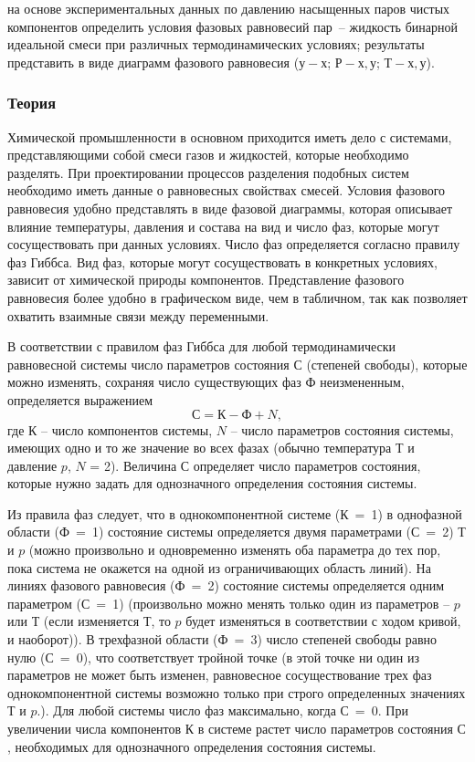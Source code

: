 
\goal на основе экспериментальных данных по давлению насыщенных паров чистых компонентов определить условия фазовых равновесий пар~-- жидкость бинарной идеальной смеси при различных термодинамических условиях; результаты представить в виде диаграмм фазового равновесия ($у-х$; $Р-х, у$; $Т-х, у$).

\subsubsection{Теория}

Химической промышленности в основном приходится иметь дело с системами, представляющими собой смеси газов и жидкостей, которые необходимо разделять. При проектировании процессов разделения подобных систем необходимо иметь данные о равновесных свойствах смесей. Условия фазового равновесия удобно представлять в виде фазовой диаграммы, которая описывает влияние температуры, давления и состава на вид и число фаз, которые могут сосуществовать при данных условиях. Число фаз определяется согласно правилу фаз Гиббса. Вид фаз, которые могут сосуществовать в конкретных условиях, зависит от химической природы компонентов. Представление фазового равновесия более удобно в графическом виде, чем в табличном, так как позволяет охватить взаимные связи между переменными.

В соответствии с правилом фаз Гиббса для любой термодинамически равновесной системы число параметров состояния $С$ (степеней свободы), которые можно изменять, сохраняя число существующих фаз $Ф$ неизмененным, определяется выражением
\begin{equation}
С=К-Ф+N,
\end{equation}
где $К$ – число компонентов системы, $N$ – число параметров состояния системы, имеющих одно и то же значение во всех фазах (обычно температура $Т$ и давление $p$, $N$ = 2). Величина $С$ определяет число параметров состояния, которые нужно задать для однозначного определения состояния системы.

Из правила фаз следует, что в однокомпонентной системе ($К$ = 1) в однофазной области ($Ф$ = 1) состояние системы определяется двумя параметрами ($С$ = 2) $Т$ и $p$ (можно произвольно и одновременно изменять оба параметра до тех пор, пока система не окажется на одной из ограничивающих область линий). На линиях фазового равновесия ($Ф$ = 2) состояние системы определяется одним параметром ($С$ = 1) (произвольно можно менять только один из параметров – $p$ или $Т$ (если изменяется $Т$, то $p$ будет изменяться в соответствии с ходом кривой, и наоборот)). В трехфазной области ($Ф$ = 3) число степеней свободы равно нулю ($С$ = 0), что соответствует тройной точке (в этой точке ни один из параметров не может быть изменен, равновесное сосуществование трех фаз однокомпонентной системы возможно только при строго определенных значениях $Т$ и $p$.). Для любой системы число фаз максимально, когда $С$ = 0. При увеличении числа компонентов $К$ в системе растет число параметров состояния $С$, необходимых для однозначного определения состояния системы.

